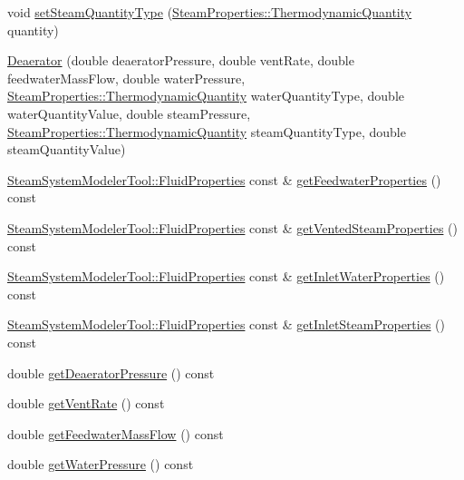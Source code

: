 \begin{DoxyCompactItemize}
\item 
void \hyperlink{class_deaerator_a1aa3b3de064d148479af9576e717b6c2}{set\+Steam\+Quantity\+Type} (\hyperlink{class_steam_properties_ae0294bedf7d178c2d8fb6aed0f62fbff}{Steam\+Properties\+::\+Thermodynamic\+Quantity} quantity)
\item 
\hyperlink{class_deaerator_a02311c34cbe46384187292e5f844984c}{Deaerator} (double deaerator\+Pressure, double vent\+Rate, double feedwater\+Mass\+Flow, double water\+Pressure, \hyperlink{class_steam_properties_ae0294bedf7d178c2d8fb6aed0f62fbff}{Steam\+Properties\+::\+Thermodynamic\+Quantity} water\+Quantity\+Type, double water\+Quantity\+Value, double steam\+Pressure, \hyperlink{class_steam_properties_ae0294bedf7d178c2d8fb6aed0f62fbff}{Steam\+Properties\+::\+Thermodynamic\+Quantity} steam\+Quantity\+Type, double steam\+Quantity\+Value)
\item 
\hyperlink{struct_steam_system_modeler_tool_1_1_fluid_properties}{Steam\+System\+Modeler\+Tool\+::\+Fluid\+Properties} const  \& \hyperlink{class_deaerator_ab2ab900e36c86e48ad92c4013c471d6b}{get\+Feedwater\+Properties} () const
\item 
\hyperlink{struct_steam_system_modeler_tool_1_1_fluid_properties}{Steam\+System\+Modeler\+Tool\+::\+Fluid\+Properties} const  \& \hyperlink{class_deaerator_a576a4632452268f77839334d87d5abff}{get\+Vented\+Steam\+Properties} () const
\item 
\hyperlink{struct_steam_system_modeler_tool_1_1_fluid_properties}{Steam\+System\+Modeler\+Tool\+::\+Fluid\+Properties} const  \& \hyperlink{class_deaerator_a9138c93cf6643e91ad7ce0de7fb328b7}{get\+Inlet\+Water\+Properties} () const
\item 
\hyperlink{struct_steam_system_modeler_tool_1_1_fluid_properties}{Steam\+System\+Modeler\+Tool\+::\+Fluid\+Properties} const  \& \hyperlink{class_deaerator_a7298fa1e4930e73dd5340411e8ccff33}{get\+Inlet\+Steam\+Properties} () const
\item 
double \hyperlink{class_deaerator_ac16cacdeef74e45f951fe992bac4e9e3}{get\+Deaerator\+Pressure} () const
\item 
double \hyperlink{class_deaerator_ad0262491c2bd9a6f820eaaba54498bcd}{get\+Vent\+Rate} () const
\item 
double \hyperlink{class_deaerator_ae1524e8b406c3d5c2823ae4e6bafe389}{get\+Feedwater\+Mass\+Flow} () const
\item 
double \hyperlink{class_deaerator_ae86ef305a8641d61ec76bd39bb84f28b}{get\+Water\+Pressure} () const
\item 

\end{DoxyCompactItemize}
